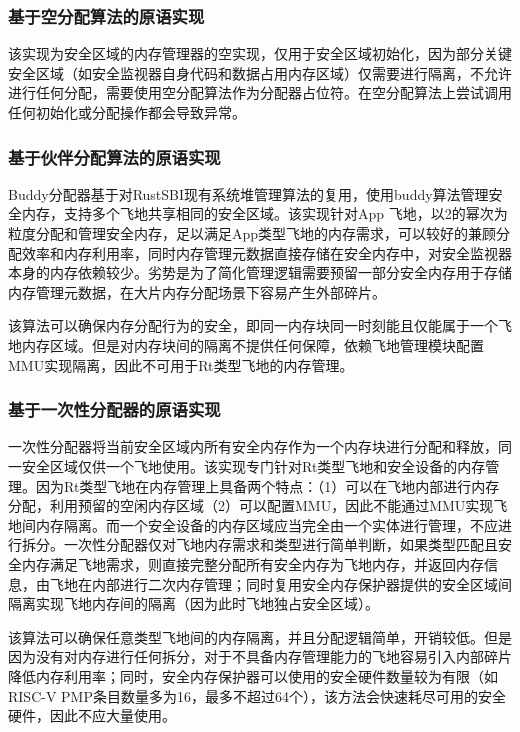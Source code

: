 \documentclass[master, vlined, review]{DissertUESTC}
\begin{document}
	\subsubsection{基于空分配算法的原语实现}
	该实现为安全区域的内存管理器的空实现，仅用于安全区域初始化，因为部分关键安全区域（如安全监视器自身代码和数据占用内存区域）仅需要进行隔离，不允许进行任何分配，需要使用空分配算法作为分配器占位符。在空分配算法上尝试调用任何初始化或分配操作都会导致异常。
	
	\subsubsection{基于伙伴分配算法的原语实现}
	Buddy分配器基于对RustSBI现有系统堆管理算法的复用，使用buddy算法管理安全内存，支持多个飞地共享相同的安全区域。该实现针对App 飞地，以2的幂次为粒度分配和管理安全内存，足以满足App类型飞地的内存需求，可以较好的兼顾分配效率和内存利用率，同时内存管理元数据直接存储在安全内存中，对安全监视器本身的内存依赖较少。劣势是为了简化管理逻辑需要预留一部分安全内存用于存储内存管理元数据，在大片内存分配场景下容易产生外部碎片。
	
	该算法可以确保内存分配行为的安全，即同一内存块同一时刻能且仅能属于一个飞地内存区域。但是对内存块间的隔离不提供任何保障，依赖飞地管理模块配置MMU实现隔离，因此不可用于Rt类型飞地的内存管理。
	
	\subsubsection{基于一次性分配器的原语实现}
	一次性分配器将当前安全区域内所有安全内存作为一个内存块进行分配和释放，同一安全区域仅供一个飞地使用。该实现专门针对Rt类型飞地和安全设备的内存管理。因为Rt类型飞地在内存管理上具备两个特点：（1）可以在飞地内部进行内存分配，利用预留的空闲内存区域（2）可以配置MMU，因此不能通过MMU实现飞地间内存隔离。而一个安全设备的内存区域应当完全由一个实体进行管理，不应进行拆分。一次性分配器仅对飞地内存需求和类型进行简单判断，如果类型匹配且安全内存满足飞地需求，则直接完整分配所有安全内存为飞地内存，并返回内存信息，由飞地在内部进行二次内存管理；同时复用安全内存保护器提供的安全区域间隔离实现飞地内存间的隔离（因为此时飞地独占安全区域）。
	
	该算法可以确保任意类型飞地间的内存隔离，并且分配逻辑简单，开销较低。但是因为没有对内存进行任何拆分，对于不具备内存管理能力的飞地容易引入内部碎片降低内存利用率；同时，安全内存保护器可以使用的安全硬件数量较为有限（如RISC-V PMP条目数量多为16，最多不超过64个），该方法会快速耗尽可用的安全硬件，因此不应大量使用。
	
\end{document}
